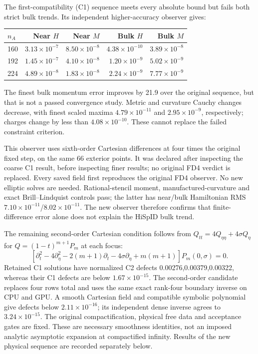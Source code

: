 \documentclass[aps,prd,preprint,notitlepage,nofootinbib]{revtex4-2}
\begin{document}
The first-compatibility (C1) sequence meets every absolute bound but fails
both strict bulk trends. Its independent higher-accuracy observer gives:
\begin{center}\footnotesize
\begin{tabular}{@{}lrrrr@{}}\toprule
$n_A$ & Near $H$ & Near $M$ & Bulk $H$ & Bulk $M$\\\midrule
160 & $3.13\times10^{-7}$ & $8.50\times10^{-8}$ & $4.38\times10^{-10}$ & $3.89\times10^{-8}$\\
192 & $1.45\times10^{-7}$ & $4.10\times10^{-8}$ & $1.20\times10^{-9}$ & $5.02\times10^{-9}$\\
224 & $4.89\times10^{-8}$ & $1.83\times10^{-8}$ & $2.24\times10^{-9}$ & $7.77\times10^{-9}$\\\bottomrule
\end{tabular}\end{center}
The finest bulk momentum error improves by 21.9 over the original sequence,
but that is not a passed convergence study. Metric and curvature Cauchy
changes decrease, with finest scaled maxima $4.79\times10^{-11}$ and
$2.95\times10^{-9}$, respectively; charges change by less than
$4.08\times10^{-10}$. These cannot replace the failed constraint criterion.

This observer uses sixth-order Cartesian differences at four times the
original fixed step, on the same 66 exterior points. It was declared after
inspecting the coarse C1 result, before inspecting finer results; no original
FD4 verdict is replaced. Every saved field first reproduces the original
FD4 observer. No new elliptic solves are needed. Rational-stencil moment,
manufactured-curvature and exact Brill--Lindquist controls pass; the latter
has near/bulk Hamiltonian RMS $7.10\times10^{-11}$/$8.02\times10^{-11}$.
The new observer therefore confirms that finite-difference error alone does
not explain the HiSpID bulk trend.

The remaining second-order Cartesian condition follows from
$Q_{tt}=4Q_{\eta\eta}+4\sigma Q_\eta$ for
$Q=(1-t)^{m+1}P_m$ at each focus:
\[
 [\partial_t^2-4\partial_\eta^2-2(m+1)\partial_t
 -4\sigma\partial_\eta+m(m+1)]P_m(0,\sigma)=0.
\]
Retained C1 solutions have normalized C2 defects 0.00276,0.00379,0.00322,
whereas their C1 defects are below $1.67\times10^{-15}$. The second-order
candidate replaces four rows total and uses the same exact rank-four
boundary inverse on CPU and GPU. A smooth Cartesian field and compatible
symbolic polynomial give defects below $2.11\times10^{-16}$; its independent
dense inverse agrees to $3.24\times10^{-15}$. The original compactification,
physical free data and acceptance gates are fixed. These are necessary
smoothness identities, not an imposed analytic asymptotic expansion at
compactified infinity. Results of the new physical sequence are recorded
separately below.
\end{document}
